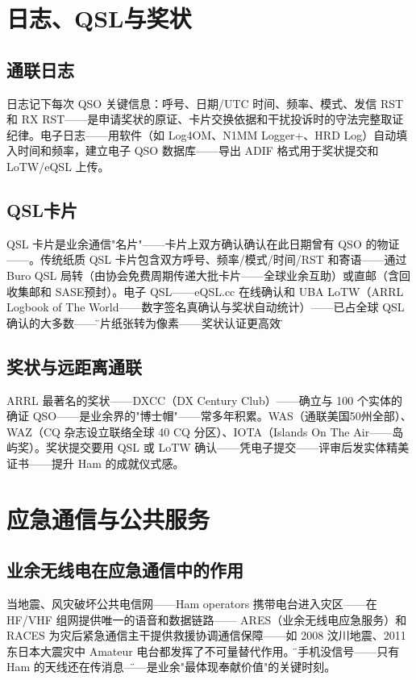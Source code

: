 \documentclass[12pt,UTF8]{ctexbook}
\begin{document}
\section{日志、QSL与奖状}
\label{sec:ham_log_qsl}

\subsection{通联日志}
日志记下每次 QSO 关键信息：呼号、日期/UTC 时间、频率、模式、发信 RST 和 RX RST——是申请奖状的原证、卡片交换依据和干扰投诉时的守法完整取证纪律。电子日志——用软件（如 Log4OM、N1MM Logger+、HRD Log）自动填入时间和频率，建立电子 QSO 数据库——导出 ADIF 格式用于奖状提交和 LoTW/eQSL 上传。

\subsection{QSL卡片}
QSL 卡片是业余通信"名片"——卡片上双方确认确认在此日期曾有 QSO 的物证——。传统纸质 QSL 卡片包含双方呼号、频率/模式/时间/RST 和寄语——通过 Buro QSL 局转（由协会免费周期传递大批卡片——全球业余互助）或直邮（含回收集邮和 SASE预封）。电子 QSL——eQSL.cc 在线确认和 UBA LoTW（ARRL Logbook of The World——数字签名真确认与奖状自动统计）——已占全球 QSL 确认的大多数——\"卡片纸张转为像素——奖状认证更高效\"。

\subsection{奖状与远距离通联}
ARRL 最著名的奖状——DXCC（DX Century Club）——确立与 100 个实体的确证 QSO——是业余界的"博士帽"——常多年积累。WAS（通联美国50州全部）、WAZ（CQ 杂志设立联络全球 40 CQ 分区）、IOTA（Islands On The Air——岛屿奖）。奖状提交要用 QSL 或 LoTW 确认——凭电子提交——评审后发实体精美证书——提升 Ham 的成就仪式感。

\section{应急通信与公共服务}
\label{sec:ham_emergency}

\subsection{业余无线电在应急通信中的作用}
当地震、风灾破坏公共电信网——Ham operators 携带电台进入灾区——在 HF/VHF 组网提供唯一的语音和数据链路—— ARES（业余无线电应急服务）和 RACES 为灾后紧急通信主干提供救援协调通信保障——如 2008 汶川地震、2011 东日本大震灾中 Amateur 电台都发挥了不可量替代作用。\"当手机没信号——只有 Ham 的天线还在传消息\"——是业余"最体现奉献价值"的关键时刻。
\end{document}
